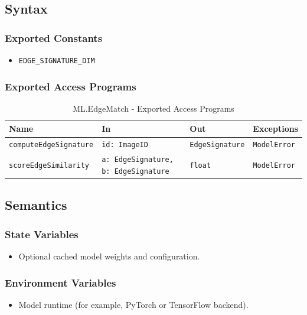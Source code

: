 \documentclass[12pt, titlepage]{article}
\begin{document}
\subsection{Syntax}

\subsubsection{Exported Constants}
\begin{itemize}
    \item \texttt{EDGE\_SIGNATURE\_DIM}
\end{itemize}

\subsubsection{Exported Access Programs}

\begin{table}[H]
\centering
\small
\caption{ML.EdgeMatch - Exported Access Programs}
\begin{tabular}{p{4cm} p{4.5cm} p{2.3cm} p{3.2cm}}
\toprule
\textbf{Name} & \textbf{In} & \textbf{Out} & \textbf{Exceptions} \\
\midrule
\texttt{computeEdgeSignature} & \texttt{id: ImageID} & \texttt{EdgeSignature} & \texttt{ModelError} \\
\texttt{scoreEdgeSimilarity} & \texttt{a: EdgeSignature, b: EdgeSignature} & \texttt{float} & \texttt{ModelError} \\
\bottomrule
\end{tabular}
\end{table}

\subsection{Semantics}

\subsubsection{State Variables}
\begin{itemize}
    \item Optional cached model weights and configuration.
\end{itemize}

\subsubsection{Environment Variables}
\begin{itemize}
    \item Model runtime (for example, PyTorch or TensorFlow backend).
\end{itemize}
\end{document}
